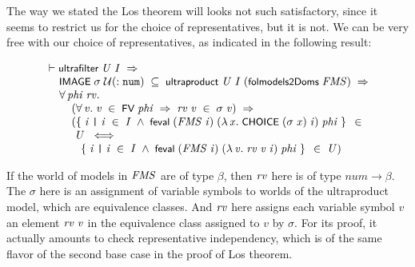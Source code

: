 \documentclass[letterpaper]{article}
\renewcommand{\HOLConst}[1]{{\textsf{\upshape\small #1}}}
\renewcommand{\HOLinline}[1]{\ensuremath{#1}}
\newenvironment{holmath}{\begin{displaymath}\begin{array}{l}}{\end{array}\end{displaymath}\ignorespacesafterend}
\begin{document}
The way we stated the Los theorem will looks not such satisfactory, since it seems to restrict us for the choice of representatives, but it is not. We can be very free with our choice of representatives, as indicated in the following result:

\begin{holmath}
  \ensuremath{\HOLTokenTurnstile}\HOLConst{ultrafilter}\;\HOLFreeVar{U}\;\HOLFreeVar{I}\;\HOLSymConst{\HOLTokenImp{}}\\
\;\;\;\;\;\HOLConst{IMAGE}\;\HOLFreeVar{\ensuremath{\sigma}}\;\ensuremath{\cal{U}}(:\HOLTyOp{num})\;\HOLSymConst{\HOLTokenSubset{}}\;\HOLConst{ultraproduct}\;\HOLFreeVar{U}\;\HOLFreeVar{I}\;(\HOLConst{folmodels2Doms}\;\HOLFreeVar{FMS})\;\HOLSymConst{\HOLTokenImp{}}\\
\;\;\;\;\;\HOLSymConst{\HOLTokenForall{}}\HOLBoundVar{phi}\;\HOLBoundVar{rv}.\\
\;\;\;\;\;\;\;\;\;(\HOLSymConst{\HOLTokenForall{}}\HOLBoundVar{v}.\;\HOLBoundVar{v}\;\HOLSymConst{\HOLTokenIn{}}\;\HOLConst{FV}\;\HOLBoundVar{phi}\;\HOLSymConst{\HOLTokenImp{}}\;\HOLBoundVar{rv}\;\HOLBoundVar{v}\;\HOLSymConst{\HOLTokenIn{}}\;\HOLFreeVar{\ensuremath{\sigma}}\;\HOLBoundVar{v})\;\HOLSymConst{\HOLTokenImp{}}\\
\;\;\;\;\;\;\;\;\;(\HOLTokenLeftbrace{}\HOLBoundVar{i}\;\HOLTokenBar{}\;\HOLBoundVar{i}\;\HOLSymConst{\HOLTokenIn{}}\;\HOLFreeVar{I}\;\HOLSymConst{\HOLTokenConj{}}\;\HOLConst{feval}\;(\HOLFreeVar{FMS}\;\HOLBoundVar{i})\;(\HOLTokenLambda{}\HOLBoundVar{x}.\;\HOLConst{CHOICE}\;(\HOLFreeVar{\ensuremath{\sigma}}\;\HOLBoundVar{x})\;\HOLBoundVar{i})\;\HOLBoundVar{phi}\HOLTokenRightbrace{}\;\HOLSymConst{\HOLTokenIn{}}\\
\;\;\;\;\;\;\;\;\;\;\HOLFreeVar{U}\;\HOLSymConst{\HOLTokenEquiv{}}\\
\;\;\;\;\;\;\;\;\;\;\;\;\HOLTokenLeftbrace{}\HOLBoundVar{i}\;\HOLTokenBar{}\;\HOLBoundVar{i}\;\HOLSymConst{\HOLTokenIn{}}\;\HOLFreeVar{I}\;\HOLSymConst{\HOLTokenConj{}}\;\HOLConst{feval}\;(\HOLFreeVar{FMS}\;\HOLBoundVar{i})\;(\HOLTokenLambda{}\HOLBoundVar{v}.\;\HOLBoundVar{rv}\;\HOLBoundVar{v}\;\HOLBoundVar{i})\;\HOLBoundVar{phi}\HOLTokenRightbrace{}\;\HOLSymConst{\HOLTokenIn{}}\;\HOLFreeVar{U})
\end{holmath}

If the world of models in \HOLinline{\HOLFreeVar{FMS}} are of type $\beta$, then \HOLinline{\HOLFreeVar{rv}} here is of type $num\to\beta$. The $\sigma$ here is an assignment of variable symbols to worlds of the ultraproduct model, which are equivalence classes. And \HOLinline{\HOLFreeVar{rv}} here assigns each variable symbol $v$ an element \HOLinline{\HOLFreeVar{rv}\;\HOLFreeVar{v}} in the equivalence class assigned to $v$ by $\sigma$.%
For its proof, it actually amounts to check representative independency, which is of the same flavor of the second base case in the proof of Los theorem.
\end{document}

